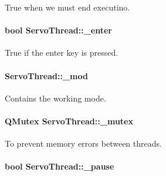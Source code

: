 True when we must end executino. 

\hypertarget{a00009_a5a3c1e2c09b76890790458b9d0469714}{}
\paragraph[{\+\_\+enter}]{\setlength{\rightskip}{0pt plus 5cm}bool Servo\+Thread\+::\+\_\+enter\hspace{0.3cm}{\ttfamily [private]}}\label{a00009_a5a3c1e2c09b76890790458b9d0469714}


True if the enter key is pressed. 

\hypertarget{a00009_acdecea1688594d3ab7386a6db97dd90d}{}
\paragraph[{\+\_\+mod}]{ Servo\+Thread\+::\+\_\+mod\hspace{0.3cm}{\ttfamily [private]}}\label{a00009_acdecea1688594d3ab7386a6db97dd90d}


Contains the working mode. 

\hypertarget{a00009_a6327eafc0dac189ec1b202d63ef32457}{}
\paragraph[{\+\_\+mutex}]{\setlength{\rightskip}{0pt plus 5cm}Q\+Mutex Servo\+Thread\+::\+\_\+mutex\hspace{0.3cm}{\ttfamily [private]}}\label{a00009_a6327eafc0dac189ec1b202d63ef32457}


To prevent memory errors between threads. 

\hypertarget{a00009_aaf2ef80e8e43518b75d20a5102970d2e}{}
\paragraph[{\+\_\+pause}]{\setlength{\rightskip}{0pt plus 5cm}bool Servo\+Thread\+::\+\_\+pause\hspace{0.3cm}{\ttfamily [private]}}\label{a00009_aaf2ef80e8e43518b75d20a5102970d2e}


